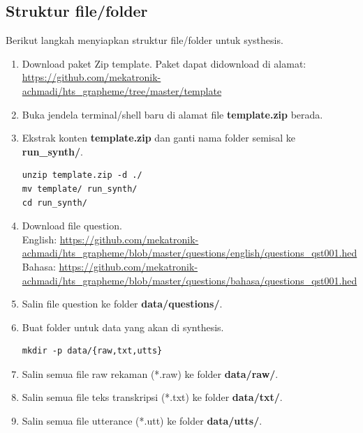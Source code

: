 \documentclass[12pt,]{article}
\begin{document}
	\subsection{Struktur file/folder}
	
	Berikut langkah menyiapkan struktur file/folder untuk systhesis.
	
	\begin{enumerate}
		\item Download paket Zip template.
		Paket dapat didownload di alamat:\\
		\url{https://github.com/mekatronik-achmadi/hts_grapheme/tree/master/template}
		
		\item Buka jendela terminal/shell baru di alamat file \textbf{template.zip} berada.
		
		
		\item Ekstrak konten \textbf{template.zip} dan ganti nama folder semisal ke \textbf{run\_synth/}.
		\begin{verbatim}
unzip template.zip -d ./
mv template/ run_synth/
cd run_synth/
		\end{verbatim}
		
		\item Download file question.\\
		English: \url{https://github.com/mekatronik-achmadi/hts_grapheme/blob/master/questions/english/questions_qst001.hed}\\
		Bahasa: \url{https://github.com/mekatronik-achmadi/hts_grapheme/blob/master/questions/bahasa/questions_qst001.hed}
		
		\item Salin file question ke folder \textbf{data/questions/}.
		
		\item Buat folder untuk data yang akan di synthesis.
		\begin{verbatim}
mkdir -p data/{raw,txt,utts}
		\end{verbatim}
		
		\item Salin semua file raw rekaman (*.raw) ke folder \textbf{data/raw/}.
		
		\item Salin semua file teks transkripsi (*.txt) ke folder \textbf{data/txt/}.
		
		\item Salin semua file utterance (*.utt) ke folder \textbf{data/utts/}.
		

\end{enumerate}
\end{document}
